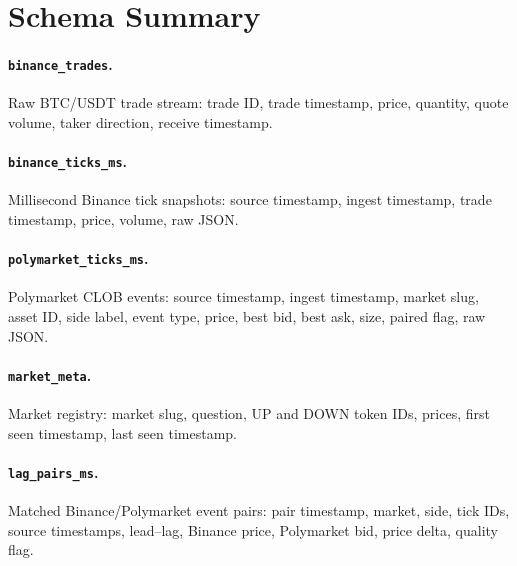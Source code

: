 \appendix
\section{Schema Summary}
\label{app:schema}

\paragraph{\texttt{binance\_trades}.}
Raw BTC/USDT trade stream: trade ID, trade timestamp, price, quantity, quote
volume, taker direction, receive timestamp.

\paragraph{\texttt{binance\_ticks\_ms}.}
Millisecond Binance tick snapshots: source timestamp, ingest timestamp, trade
timestamp, price, volume, raw JSON.

\paragraph{\texttt{polymarket\_ticks\_ms}.}
Polymarket CLOB events: source timestamp, ingest timestamp, market slug, asset
ID, side label, event type, price, best bid, best ask, size, paired flag, raw
JSON.

\paragraph{\texttt{market\_meta}.}
Market registry: market slug, question, UP and DOWN token IDs, prices, first
seen timestamp, last seen timestamp.

\paragraph{\texttt{lag\_pairs\_ms}.}
Matched Binance/Polymarket event pairs: pair timestamp, market, side, tick IDs,
source timestamps, lead--lag, Binance price, Polymarket bid, price delta, quality
flag.
